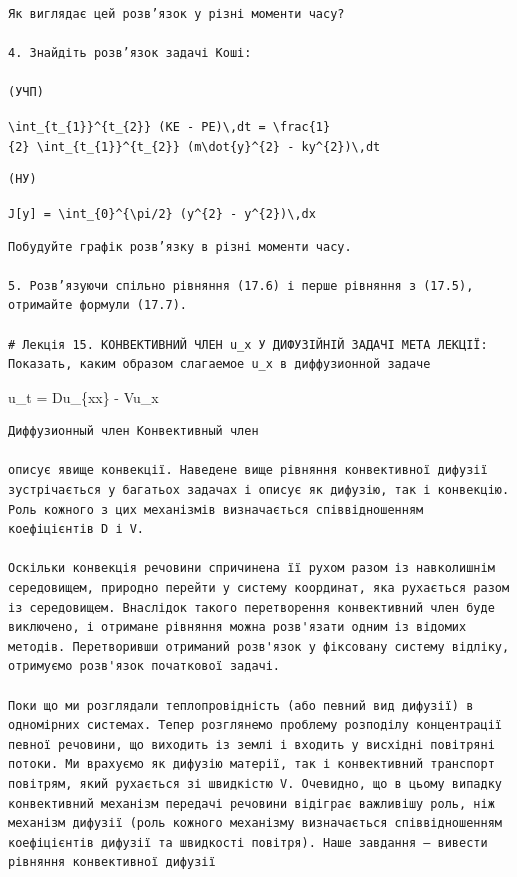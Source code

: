 \documentclass[
  ukrainian,
]{article}
\begin{document}
\begin{verbatim}
Як виглядає цей розв’язок у різні моменти часу?

4. Знайдіть розв’язок задачі Коші:

(УЧП)
\end{verbatim}

\texttt{\textbackslash{}int\_\{t\_\{1\}\}\^{}\{t\_\{2\}\}\ (KE\ -\ PE)\textbackslash{},dt\ =\ \textbackslash{}frac\{1\}\{2\}\ \textbackslash{}int\_\{t\_\{1\}\}\^{}\{t\_\{2\}\}\ (m\textbackslash{}dot\{y\}\^{}\{2\}\ -\ ky\^{}\{2\})\textbackslash{},dt}

\begin{verbatim}
(НУ)
\end{verbatim}

\texttt{J{[}y{]}\ =\ \textbackslash{}int\_\{0\}\^{}\{\textbackslash{}pi/2\}\ (y\textquotesingle{}\^{}\{2\}\ -\ y\^{}\{2\})\textbackslash{},dx}

\begin{verbatim}
Побудуйте графік розв’язку в різні моменти часу.

5. Розв’язуючи спільно рівняння (17.6) і перше рівняння з (17.5), отримайте формули (17.7).

# Лекція 15. КОНВЕКТИВНИЙ ЧЛЕН u_x У ДИФУЗІЙНІЙ ЗАДАЧІ МЕТА ЛЕКЦІЇ: Показать, каким образом слагаемое u_x в диффузионной задаче
\end{verbatim}

u\_t = Du\_\{xx\} - Vu\_x

\begin{verbatim}
Диффузионный член Конвективный член

описує явище конвекції. Наведене вище рівняння конвективної дифузії зустрічається у багатьох задачах і описує як дифузію, так і конвекцію. Роль кожного з цих механізмів визначається співвідношенням коефіцієнтів D і V.

Оскільки конвекція речовини спричинена її рухом разом із навколишнім середовищем, природно перейти у систему координат, яка рухається разом із середовищем. Внаслідок такого перетворення конвективний член буде виключено, і отримане рівняння можна розв'язати одним із відомих методів. Перетворивши отриманий розв'язок у фіксовану систему відліку, отримуємо розв'язок початкової задачі.

Поки що ми розглядали теплопровідність (або певний вид дифузії) в одномірних системах. Тепер розглянемо проблему розподілу концентрації певної речовини, що виходить із землі і входить у висхідні повітряні потоки. Ми врахуємо як дифузію матерії, так і конвективний транспорт повітрям, який рухається зі швидкістю V. Очевидно, що в цьому випадку конвективний механізм передачі речовини відіграє важливішу роль, ніж механізм дифузії (роль кожного механізму визначається співвідношенням коефіцієнтів дифузії та швидкості повітря). Наше завдання — вивести рівняння конвективної дифузії
\end{verbatim}
\end{document}
